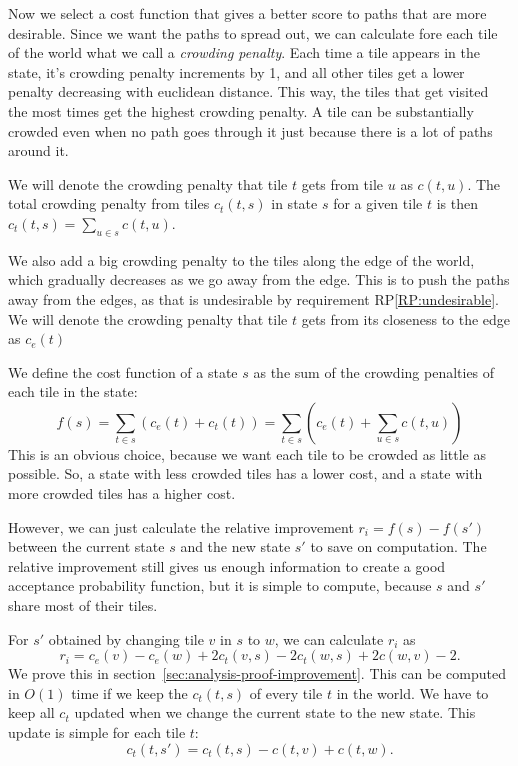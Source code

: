 Now we select a cost function that gives a better score to paths that are more desirable.
Since we want the paths to spread out, we can calculate fore each tile of the world what we call a \emph{crowding penalty}.
Each time a tile appears in the state, it's crowding penalty increments by 1, and all other tiles get a lower penalty decreasing with euclidean distance.
This way, the tiles that get visited the most times get the highest crowding penalty.
A tile can be substantially crowded even when no path goes through it just because there is a lot of paths around it.

We will denote the crowding penalty that tile $t$ gets from tile $u$ as $c(t,u)$.
The total crowding penalty from tiles $c_t(t,s)$ in state $s$ for a given tile $t$ is then $c_t(t,s) = \sum_{u \in s} c(t,u)$.

We also add a big crowding penalty to the tiles along the edge of the world, which gradually decreases as we go away from the edge.
This is to push the paths away from the edges, as that is undesirable by requirement RP\ref{RP:undesirable}.
We will denote the crowding penalty that tile $t$ gets from its closeness to the edge as $c_e(t)$

We define the cost function of a state $s$ as the sum of the crowding penalties of each tile in the state:
\begin{equation*}
    f(s) = \sum_{t \in s} \left(c_e(t) + c_t(t)\right) = \sum_{t \in s} \left(c_e(t) + \sum_{u \in s} c(t,u) \right)
\end{equation*}
This is an obvious choice, because we want each tile to be crowded as little as possible.
So, a state with less crowded tiles has a lower cost, and a state with more crowded tiles has a higher cost.

However, we can just calculate the relative improvement $r_i = f(s) - f(s')$ between the current state $s$ and the new state $s'$ to save on computation.
The relative improvement still gives us enough information to create a good acceptance probability function, but it is simple to compute, because $s$ and $s'$ share most of their tiles.

For $s'$ obtained by changing tile $v$ in $s$ to $w$, we can calculate $r_i$ as
\begin{equation*}
    r_i = c_e(v) - c_e(w)  + 2 c_t(v,s) - 2 c_t(w,s) + 2c(w,v) - 2.
\end{equation*}
We prove this in section~\ref{sec:analysis-proof-improvement}.
This can be computed in $O(1)$ time if we keep the $c_t(t,s)$ of every tile $t$ in the world.
We have to keep all $c_t$ updated when we change the current state to the new state.
This update is simple for each tile $t$:
\begin{equation*}
    c_t(t,s') = c_t(t,s) - c(t,v) + c(t,w).
\end{equation*}

